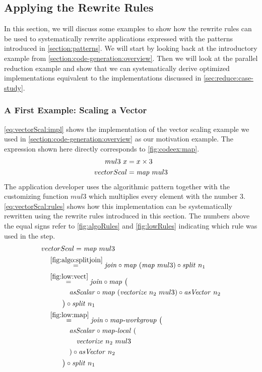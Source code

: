\subsection{Applying the Rewrite Rules}
\label{sec:example}
\label{sec:applying:rules}
In this section, we will discuss some examples to show how the rewrite rules can be used to systematically rewrite applications expressed with the patterns introduced in \autoref{section:patterns}.
We will start by looking back at the introductory example from \autoref{section:code-generation:overview}.
Then we will look at the parallel reduction example and show that we can systematically derive optimized implementations equivalent to the implementations discussed in \autoref{sec:reduce:case-study}.

\subsubsection{A First Example: Scaling a Vector}
\autoref{eq:vectorScal:impl} shows the implementation of the vector scaling example we used in \autoref{section:code-generation:overview} as our motivation example.
The expression shown here directly corresponds to \autoref{fig:codeex:map}.
\begin{align}
  mul3\ x &= x \times 3\nonumber\\
  vectorScal &= \text{\textit{map}}\ mul3
  \label{eq:vectorScal:impl}
\end{align}
The application developer uses the algorithmic pattern \map together with the customizing function $mul3$ which multiplies every element with the number $3$.
\autoref{eq:vectorScal:rules} shows how this implementation can be systematically rewritten using the rewrite rules introduced in this section.
The numbers above the equal signs refer to \autoref{fig:algoRules} and \autoref{fig:lowRules} indicating which rule was used in the step.
\begin{align}
  &vectorScal = \text{\textit{map}}\ mul3\nonumber\\
  &\quad\begin{aligned}
    &\overset{\ref{fig:algo:splitjoin}}{=\hspace{.2em}}
      \text{\textit{join}} \circ \text{\textit{map}}\ (\text{\textit{map}}\ mul3) \circ \text{\textit{split}}\ n_1\\
    &\overset{\ref{fig:low:vect}}{=\hspace{.2em}}
      \text{\textit{join}} \circ \text{\textit{map}}\ \big(\\
      &\qquad\quad \text{\textit{asScalar}} \circ \text{\textit{map}}\ (\text{\textit{vectorize}}\ n_2\ mul3) \circ \text{\textit{asVector}}\ n_2\\
      &\qquad\big) \circ \text{\textit{split}}\ n_1\\
    &\overset{\ref{fig:low:map}}{=\hspace{.2em}}
      \text{\textit{join}} \circ \text{\textit{map-workgroup}}\ \big(\\
      &\qquad\quad \text{\textit{asScalar}} \circ \text{\textit{map-local}}\ (\\
      &\qquad\qquad\text{\textit{vectorize}}\ n_2\ mul3\\
      &\qquad\quad) \circ \text{\textit{asVector}}\ n_2\\
      &\qquad\big) \circ \text{\textit{split}}\ n_1
  \end{aligned}
  \label{eq:vectorScal:rules}
\end{align}
